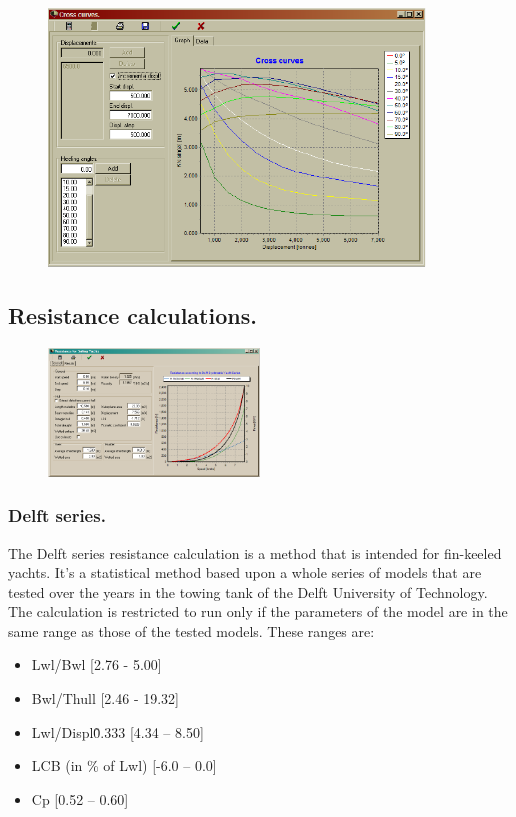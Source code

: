\documentclass[12pt]{article}
\begin{document}
\begin{figure}[h]
        \centering
        \includegraphics[width=10cm,natwidth=662,natheight=454]{crosscurvesdialog.png}
        \caption{}
        \label{fig:crosscurves}
\end{figure}

\subsection{Resistance calculations.}

\begin{figure}
        \centering
        \includegraphics[width=0.5\textwidth,natwidth=672,natheight=408]{delftdialog.png}
        \caption{}
        \label{fig:delft}
\end{figure}

\subsubsection{Delft series.}
The Delft series resistance calculation is a method that is intended
for fin-keeled yachts. It's a statistical method based upon a whole
series of models that are tested over the years in the towing tank of
the Delft University of Technology. The calculation is restricted to
run only if the parameters of the model are in the same range as those
of the tested models.  These ranges are:

\begin{itemize}
  \item Lwl/Bwl [2.76 - 5.00]
  \item Bwl/Thull [2.46 - 19.32]
  \item Lwl/Displ\^0.333 [4.34 – 8.50]
  \item LCB (in \% of Lwl) [-6.0 – 0.0]
  \item Cp [0.52 – 0.60]
\end{itemize}
\end{document}
